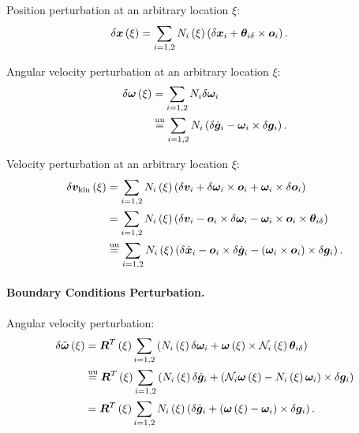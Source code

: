 Position perturbation at an arbitrary location $\xi$:
\begin{align}
	\delta\bm{x}\left( \xi \right)
	&=
	\sum_{i=1,2} N_i\left( \xi \right) \left( 
		\delta\bm{x}_i + \bm{\theta}_{i\delta}\times\bm{o}_i
	 \right)
	.
\end{align}

Angular velocity perturbation at an arbitrary location $\xi$:
\begin{align}
	\delta\bm{\omega}\left( \xi \right)
	&=
	\sum_{i=1,2} N_i \delta\bm{\omega}_i
	\nonumber \\
	&\overset{\text{uu}}{=}
	\sum_{i=1,2} N_i \left( 
		\delta\dot{\bm{g}}_i
		- \bm{\omega}_i \times \delta\bm{g}_i
	 \right)
	.
\end{align}

Velocity perturbation at an arbitrary location $\xi$:
\begin{align}
	\delta\bm{v}_{\text{kin}}\left( \xi \right)
	&=
	\sum_{i=1,2} N_i\left( \xi \right) \left( 
		\delta\bm{v}_i
		+ \delta\bm{\omega}_i \times \bm{o}_i
		+ \bm{\omega}_i \times \delta\bm{o}_i
	 \right)
	\nonumber \\
	&= 
	\sum_{i=1,2} N_i\left( \xi \right) \left( 
		\delta\bm{v}_i
		- \bm{o}_i \times \delta\bm{\omega}_i
		- \bm{\omega}_i \times \bm{o}_i \times \bm{\theta}_{i\delta}
	 \right)
	\nonumber \\
	&\overset{\text{uu}}{=}
	\sum_{i=1,2} N_i\left( \xi \right) \left( 
		\delta\dot{\bm{x}}_i
		- \bm{o}_i \times \delta\dot{\bm{g}}_i
		- \left( \bm{\omega}_i \times \bm{o}_i \right) \times \delta\bm{g}_i
	 \right)
	.
\end{align}


\paragraph{Boundary Conditions Perturbation.}
Angular velocity perturbation:
\begin{align}
	\delta\tilde{\bm{\omega}}\left( \xi \right)
	&= \bm{R}^T\left( \xi \right) \sum_{i=1,2} \left( 
		N_i\left( \xi \right) \delta\bm{\omega}_i
		+ \bm{\omega}\left( \xi \right) \times \mathcal{N}_i\left( \xi \right) \bm{\theta}_{i\delta}
	 \right)
	\nonumber \\
	&\overset{\text{uu}}{=}
	\bm{R}^T\left( \xi \right) \sum_{i=1,2} \left( 
		N_i\left( \xi \right) \delta\dot{\bm{g}}_i
		+ \left( 
			\mathcal{N}_i \bm{\omega}\left( \xi \right)
			- N_i\left( \xi \right) \bm{\omega}_i
		 \right) \times \delta\bm{g}_i
	 \right)
	\nonumber \\
	&=
	\bm{R}^T\left( \xi \right) \sum_{i=1,2} N_i\left( \xi \right) \left( 
		\delta\dot{\bm{g}}_i
		+ \left( 
			\bm{\omega}\left( \xi \right)
			- \bm{\omega}_i
		 \right) \times \delta\bm{g}_i
	 \right)
	.
\end{align}


